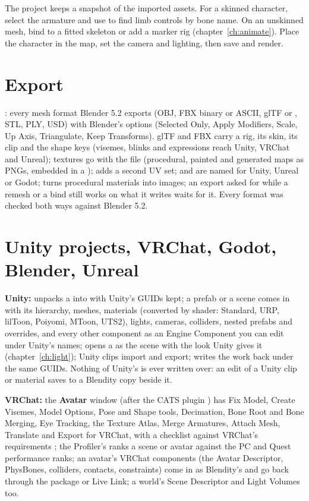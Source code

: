 The project keeps a snapshot of the imported assets. For a skinned character, select the armature and use
 to find limb controls by bone name. On an unskinned
mesh, bind to a fitted skeleton or add a marker rig (chapter~\ref{ch:animate}). Place the character in the
map, set the camera and lighting, then save and render.

\section{Export}
: every mesh format Blender 5.2 exports (OBJ, FBX binary or ASCII, glTF  or
, STL, PLY, USD) with Blender's options (Selected Only, Apply Modifiers, Scale, Up Axis, Triangulate, Keep
Transforms). glTF and FBX carry a rig, its skin, its clip and the shape keys (visemes, blinks and expressions reach
Unity, VRChat and Unreal); textures go with the file (procedural, painted and generated maps as PNGs, embedded in a
);  adds a second UV set;  and  are named for Unity, Unreal or
Godot;  turns procedural materials into images; an export asked for while a remesh or a bind still
works on what it writes waits for it. Every format was checked both ways against Blender 5.2.

\section{Unity projects, VRChat, Godot, Blender, Unreal}
\textbf{Unity:}  unpacks a  into
 with Unity's GUIDs kept; a prefab or a  scene comes in with its hierarchy,
meshes, materials (converted by shader: Standard, URP, lilToon, Poiyomi, MToon, UTS2), lights, cameras, colliders,
nested prefabs and overrides, and every other component as an Engine Component you can edit under Unity's names;
 opens a  as the scene with the look Unity gives it (chapter~\ref{ch:light});
Unity  clips import and export;  writes the work back under the same
GUIDs. Nothing of Unity's is ever written over: an edit of a Unity clip or material saves to a Blendity copy beside it.

\textbf{VRChat:} the \textbf{Avatar} window (after the CATS plugin \cite{CATS2026}) has Fix Model, Create Visemes,
Model Options, Pose and Shape tools, Decimation, Bone Root and Bone Merging, Eye Tracking, the Texture Atlas, Merge
Armatures, Attach Mesh, Translate and Export for VRChat, with a checklist against VRChat's requirements
\cite{VRChatCreators2026}; the Profiler's  ranks a scene or avatar against the PC and Quest performance
ranks; an avatar's VRChat components (the Avatar Descriptor, PhysBones, colliders, contacts, constraints) come in as
Blendity's and go back through the package or Live Link; a world's Scene Descriptor and Light Volumes too.

